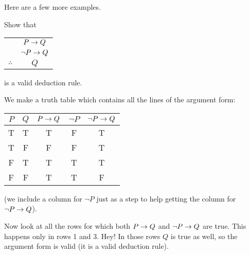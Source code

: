 \documentclass[12pt]{article}
\begin{document}
Here are a few more examples.

\begin{example}
 Show that 
 \begin{center}
  \begin{tabular}{rc}
   & $P \rightarrow Q$\\
   & $\neg P \rightarrow Q$ \\ \hline
   $\therefore$ & $Q$
  \end{tabular}
 \end{center}
is a valid deduction rule.

\begin{solution}
 We make a truth table which contains all the lines of the argument form:
 \begin{center}
  \begin{tabular}{c|c||c|c|c}
   $P$ & $Q$ & $P\rightarrow Q$ & $\neg P$ & $\neg P \rightarrow Q$ \\ \hline
   T & T & T & F & T \\ 
   T & F & F & F & T \\
   F & T & T & T & T \\
   F & F & T & T & F 
  \end{tabular}
 \end{center}
(we include a column for $\neg P$ just as a step to help getting the column for $\neg P \rightarrow Q$). 

Now look at all the rows for which both $P \rightarrow Q$ and $\neg P \rightarrow Q$ are true.  This happens only in rows 1 and 3.  Hey! In those rows $Q$ is true as well, so the argument form is valid (it is a valid deduction rule).
\end{solution}

\end{example}
\end{document}
